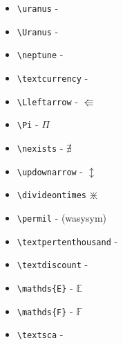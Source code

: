 \begin{multicols}{2}
\begin{itemize}
\begin{itemize}
        \item \verb+\uranus+ - %
        \item \verb+\Uranus+ - \Uranus
        \item \verb+\neptune+ - %
        \item \verb+\textcurrency+ - \textcurrency
        \item \verb+\Lleftarrow+ - $\Lleftarrow$
        \item \verb+\Pi+ - $\Pi$
        \item \verb+\nexists+ - $\nexists$
        \item \verb+\updownarrow+ - $\updownarrow$
        \item \verb+\divideontimes+ $\divideontimes$
        \item \verb+\permil+ - (wasysym)
        \item \verb+\textpertenthousand+ - \textpertenthousand
        \item \verb+\textdiscount+ - \textdiscount
        \item \verb+\mathds{E}+ - $\mathds{E}$
        \item \verb+\mathds{F}+ - $\mathds{F}$
        \item \verb+\textsca+ - %
    \end{itemize}
\end{itemize}
\end{multicols}